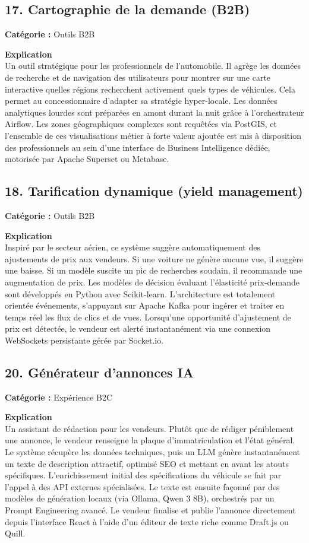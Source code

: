 \documentclass[11pt,a4paper]{article}
\begin{document}
\subsection{17. Cartographie de la demande (B2B)}
\textbf{Catégorie :} Outils B2B

\textbf{Explication}\\
Un outil stratégique pour les professionnels de l'automobile. Il agrège les données de recherche et de navigation des utilisateurs pour montrer sur une carte interactive quelles régions recherchent activement quels types de véhicules. Cela permet au concessionnaire d'adapter sa stratégie hyper-locale. Les données analytiques lourdes sont préparées en amont durant la nuit grâce à l'orchestrateur Airflow. Les zones géographiques complexes sont requêtées via PostGIS, et l'ensemble de ces visualisations métier à forte valeur ajoutée est mis à disposition des professionnels au sein d'une interface de Business Intelligence dédiée, motorisée par Apache Superset ou Metabase.

\subsection{18. Tarification dynamique (yield management)}
\textbf{Catégorie :} Outils B2B

\textbf{Explication}\\
Inspiré par le secteur aérien, ce système suggère automatiquement des ajustements de prix aux vendeurs. Si une voiture ne génère aucune vue, il suggère une baisse. Si un modèle suscite un pic de recherches soudain, il recommande une augmentation de prix. Les modèles de décision évaluant l'élasticité prix-demande sont développés en Python avec Scikit-learn. L'architecture est totalement orientée événements, s'appuyant sur Apache Kafka pour ingérer et traiter en temps réel les flux de clics et de vues. Lorsqu'une opportunité d'ajustement de prix est détectée, le vendeur est alerté instantanément via une connexion WebSockets persistante gérée par Socket.io.


\subsection{20. Générateur d'annonces IA}
\textbf{Catégorie :} Expérience B2C

\textbf{Explication}\\
Un assistant de rédaction pour les vendeurs. Plutôt que de rédiger péniblement une annonce, le vendeur renseigne la plaque d'immatriculation et l'état général. Le système récupère les données techniques, puis un LLM génère instantanément un texte de description attractif, optimisé SEO et mettant en avant les atouts spécifiques. L'enrichissement initial des spécifications du véhicule se fait par l'appel à des API externes spécialisées. Le texte est ensuite façonné par des modèles de génération locaux (via Ollama, Qwen 3 8B), orchestrés par un Prompt Engineering avancé. Le vendeur finalise et publie l'annonce directement depuis l'interface React à l'aide d'un éditeur de texte riche comme Draft.js ou Quill.
\end{document}

